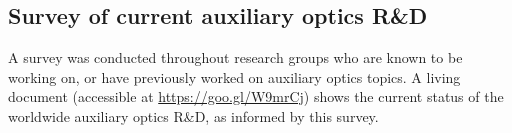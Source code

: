 \subsection{Survey of current auxiliary optics R\&D }
A survey was conducted throughout research groups who are known to be working on, or have previously worked on auxiliary optics topics. A living document (accessible at \url{https://goo.gl/W9mrCj}) shows the current status of the worldwide auxiliary optics R\&D, as informed by this survey. 


%
%
